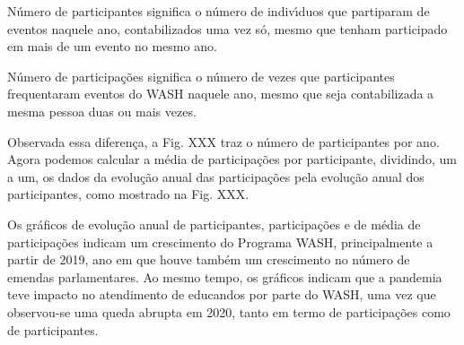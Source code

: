 \documentclass[
12pt,		%
openright,	%
twoside,  %
a4paper,			%
chapter=TITLE,		%
english,			%
french,				%
spanish,			%
brazil				%
]{USPSC-classe/USPSC}
\begin{document}
N\'umero de participantes significa o n\'umero de indiv\'{\i}duos que partiparam de eventos naquele ano, contabilizados uma vez s\'o, mesmo que tenham participado em mais de um evento no mesmo ano.

















N\'umero de participa\c{c}\~oes significa o n\'umero de vezes que participantes frequentaram eventos do WASH naquele ano, mesmo que seja contabilizada a mesma pessoa duas ou mais vezes.

















Observada essa diferen\c{c}a, a Fig. XXX traz o n\'umero de participantes por ano.  Agora podemos calcular a m\'edia de participa\c{c}\~oes por participante, dividindo, um a um, os dados da evolu\c{c}\~ao anual das participa\c{c}\~oes pela evolu\c{c}\~ao anual dos participantes, como mostrado na Fig. XXX.

















Os gr\'aficos de evolu\c{c}\~ao anual de participantes, participa\c{c}\~oes e de m\'edia de participa\c{c}\~oes indicam um crescimento do Programa WASH, principalmente a partir de 2019, ano em que houve tamb\'em um crescimento no n\'umero de emendas parlamentares. Ao mesmo tempo, os gr\'aficos indicam que a pandemia teve impacto no atendimento de educandos por parte do WASH, uma vez que observou-se uma queda abrupta em 2020, tanto em termo de participa\c{c}\~oes como de participantes.
\end{document}
